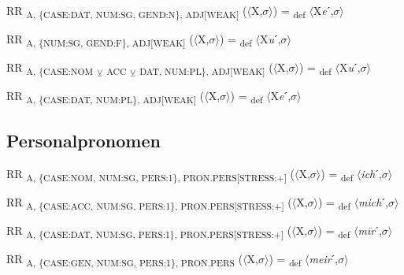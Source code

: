 {\begin{exe}
 RR \textsubscript{A, \{CASE:DAT, NUM:SG, GEND:N\}, ADJ[WEAK]} ($\langle$X,$\sigma $$\rangle$) = \textsubscript{def} $\langle$X\textit{e}ˊ,$\sigma $$\rangle$
\end{exe}

\begin{exe}
 RR \textsubscript{A, \{NUM:SG, GEND:F\}, ADJ[WEAK]} ($\langle$X,$\sigma $$\rangle$) = \textsubscript{def} $\langle$X\textit{u}ˊ,$\sigma $$\rangle$
\end{exe}

\begin{exe}
 RR \textsubscript{A, \{CASE:NOM} \textsubscript{${\veebar}$}\textsubscript{ ACC} \textsubscript{${\veebar}$}\textsubscript{ DAT, NUM:PL\}, ADJ[WEAK]} ($\langle$X,$\sigma $$\rangle$) = \textsubscript{def} $\langle$X\textit{u}ˊ,$\sigma $$\rangle$
\end{exe}

\begin{exe}
 RR \textsubscript{A, \{CASE:DAT, NUM:PL\}, ADJ[WEAK]} ($\langle$X,$\sigma $$\rangle$) = \textsubscript{def} $\langle$X\textit{e}ˊ,$\sigma $$\rangle$
\end{exe}

\subsection{Personalpronomen}

\begin{exe}
 RR \textsubscript{A, \{CASE:NOM, NUM:SG, PERS:1\}, PRON.PERS[STRESS:+]} ($\langle$X,$\sigma $$\rangle$) = \textsubscript{def} $\langle$\textit{ich}ˊ,$\sigma $$\rangle$
\end{exe}

\begin{exe}
 RR \textsubscript{A, \{CASE:ACC, NUM:SG, PERS:1\}, PRON.PERS[STRESS:+]} ($\langle$X,$\sigma $$\rangle$) = \textsubscript{def} $\langle$\textit{mich}ˊ,$\sigma $$\rangle$
\end{exe}

\begin{exe}
 RR \textsubscript{A, \{CASE:DAT, NUM:SG, PERS:1\}, PRON.PERS[STRESS:+]} ($\langle$X,$\sigma $$\rangle$) = \textsubscript{def} $\langle$\textit{m\=ir}ˊ,$\sigma $$\rangle$
\end{exe}

\begin{exe}
 RR \textsubscript{A, \{CASE:GEN, NUM:SG, PERS:1\}, PRON.PERS} ($\langle$X,$\sigma $$\rangle$) = \textsubscript{def} $\langle$\textit{meir}ˊ,$\sigma $$\rangle$
\end{exe}

}
